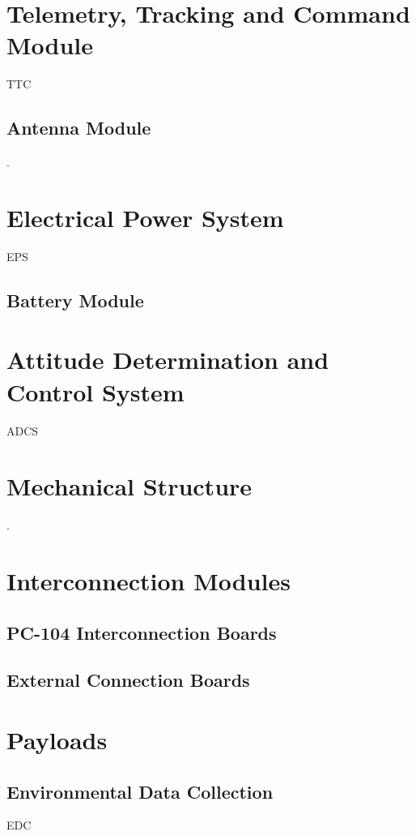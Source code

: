\section{Telemetry, Tracking and Command Module}

TTC \cite{ttc}

\subsection{Antenna Module}

.

\section{Electrical Power System}

EPS \cite{eps2}

\subsection{Battery Module}

\cite{bat4c}

\section{Attitude Determination and Control System}

ADCS

\section{Mechanical Structure}

.

\section{Interconnection Modules}

\subsection{PC-104 Interconnection Boards}

\cite{pc104-boards}

\subsection{External Connection Boards}

\cite{iip}

\section{Payloads}

\subsection{Environmental Data Collection}

EDC \cite{edc}
